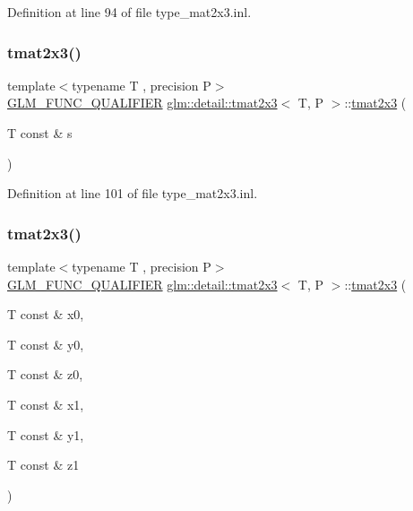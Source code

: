Definition at line 94 of file type\+\_\+mat2x3.\+inl.

\mbox{\label{structglm_1_1detail_1_1tmat2x3_aee77b4e0eece78d68bf0ae3a95c520a3}} 
\subsubsection{\texorpdfstring{tmat2x3()}{tmat2x3()}\hspace{0.1cm}{\footnotesize\ttfamily [5/22]}}
{\footnotesize\ttfamily template$<$typename T , precision P$>$ \\
\hyperlink{setup_8hpp_a33fdea6f91c5f834105f7415e2a64407}{G\+L\+M\+\_\+\+F\+U\+N\+C\+\_\+\+Q\+U\+A\+L\+I\+F\+I\+ER} \hyperlink{structglm_1_1detail_1_1tmat2x3}{glm\+::detail\+::tmat2x3}$<$ T, P $>$\+::\hyperlink{structglm_1_1detail_1_1tmat2x3}{tmat2x3} (\begin{DoxyParamCaption}\item[{T const \&}]{s }\end{DoxyParamCaption})\hspace{0.3cm}{\ttfamily [explicit]}}



Definition at line 101 of file type\+\_\+mat2x3.\+inl.

\mbox{\label{structglm_1_1detail_1_1tmat2x3_a6e7924d5ec396e17f9029f69597a7815}} 
\subsubsection{\texorpdfstring{tmat2x3()}{tmat2x3()}\hspace{0.1cm}{\footnotesize\ttfamily [6/22]}}
{\footnotesize\ttfamily template$<$typename T , precision P$>$ \\
\hyperlink{setup_8hpp_a33fdea6f91c5f834105f7415e2a64407}{G\+L\+M\+\_\+\+F\+U\+N\+C\+\_\+\+Q\+U\+A\+L\+I\+F\+I\+ER} \hyperlink{structglm_1_1detail_1_1tmat2x3}{glm\+::detail\+::tmat2x3}$<$ T, P $>$\+::\hyperlink{structglm_1_1detail_1_1tmat2x3}{tmat2x3} (\begin{DoxyParamCaption}\item[{T const \&}]{x0,  }\item[{T const \&}]{y0,  }\item[{T const \&}]{z0,  }\item[{T const \&}]{x1,  }\item[{T const \&}]{y1,  }\item[{T const \&}]{z1 }\end{DoxyParamCaption})}



